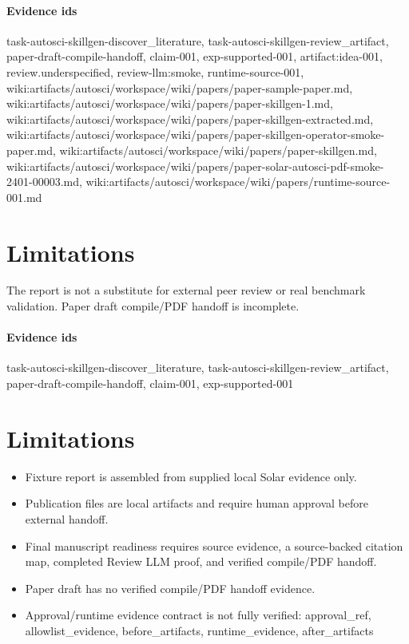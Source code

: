 \documentclass{article}
\begin{document}
\paragraph{Evidence ids} task-autosci-skillgen-discover\_literature, task-autosci-skillgen-review\_artifact, paper-draft-compile-handoff, claim-001, exp-supported-001, artifact:idea-001, review.underspecified, review-llm:smoke, runtime-source-001, wiki:artifacts/autosci/workspace/wiki/papers/paper-sample-paper.md, wiki:artifacts/autosci/workspace/wiki/papers/paper-skillgen-1.md, wiki:artifacts/autosci/workspace/wiki/papers/paper-skillgen-extracted.md, wiki:artifacts/autosci/workspace/wiki/papers/paper-skillgen-operator-smoke-paper.md, wiki:artifacts/autosci/workspace/wiki/papers/paper-skillgen.md, wiki:artifacts/autosci/workspace/wiki/papers/paper-solar-autosci-pdf-smoke-2401-00003.md, wiki:artifacts/autosci/workspace/wiki/papers/runtime-source-001.md

\section{Limitations}
The report is not a substitute for external peer review or real benchmark validation. Paper draft compile/PDF handoff is incomplete.

\paragraph{Evidence ids} task-autosci-skillgen-discover\_literature, task-autosci-skillgen-review\_artifact, paper-draft-compile-handoff, claim-001, exp-supported-001

\section{Limitations}

\begin{itemize}\item Fixture report is assembled from supplied local Solar evidence only.\end{itemize}
\begin{itemize}\item Publication files are local artifacts and require human approval before external handoff.\end{itemize}
\begin{itemize}\item Final manuscript readiness requires source evidence, a source-backed citation map, completed Review LLM proof, and verified compile/PDF handoff.\end{itemize}
\begin{itemize}\item Paper draft has no verified compile/PDF handoff evidence.\end{itemize}
\begin{itemize}\item Approval/runtime evidence contract is not fully verified: approval\_ref, allowlist\_evidence, before\_artifacts, runtime\_evidence, after\_artifacts\end{itemize}
\end{document}
